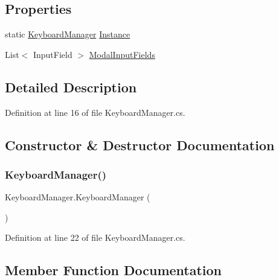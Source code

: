\subsection*{Properties}
\begin{DoxyCompactItemize}
\item 
static \hyperlink{class_keyboard_manager}{Keyboard\+Manager} \hyperlink{class_keyboard_manager_aa3ba01f0ebce34e50563d2fe607f7bbd}{Instance}
\item 
List$<$ Input\+Field $>$ \hyperlink{class_keyboard_manager_a98ebd09a48b0b924ad13e18b6dfeb969}{Modal\+Input\+Fields}
\end{DoxyCompactItemize}


\subsection{Detailed Description}


Definition at line 16 of file Keyboard\+Manager.\+cs.



\subsection{Constructor \& Destructor Documentation}
\mbox{\label{class_keyboard_manager_adb37ed218542d83894ccaa2108773da7}} 
\subsubsection{\texorpdfstring{Keyboard\+Manager()}{KeyboardManager()}}
{\footnotesize\ttfamily Keyboard\+Manager.\+Keyboard\+Manager (\begin{DoxyParamCaption}{ }\end{DoxyParamCaption})}



Definition at line 22 of file Keyboard\+Manager.\+cs.



\subsection{Member Function Documentation}
\mbox{\label{class_keyboard_manager_abe76665b5a2c3ed850d6c7edb942656e}} 
